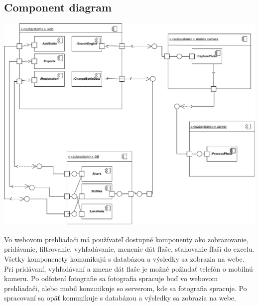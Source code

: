 \documentclass{zah}
\begin{document}
\subsection{Component diagram}
\includegraphics[width=\textwidth]{navrh-assets/component}

Vo webovom prehliadači má používateľ dostupné komponenty ako zobrazovanie, pridávanie,
filtrovanie, vyhľadávanie, menenie dát fľaše, sťahovanie fľaší do excelu. Všetky
komponenety komunikujú s databázou a výsledky sa zobrazia na webe. Pri pridávaní,
vyhľadávaní a zmene dát flaše je možné požiadať telefón o mobilnú kameru.
Po odfotení fotografie sa fotografia spracuje buď vo webovom prehliadači, alebo mobil
komunikuje so serverom, kde sa fotografia spracuje. Po spracovaní sa opäť komunikuje
s databázou a výsledky sa zobrazia na webe.
\end{document}
